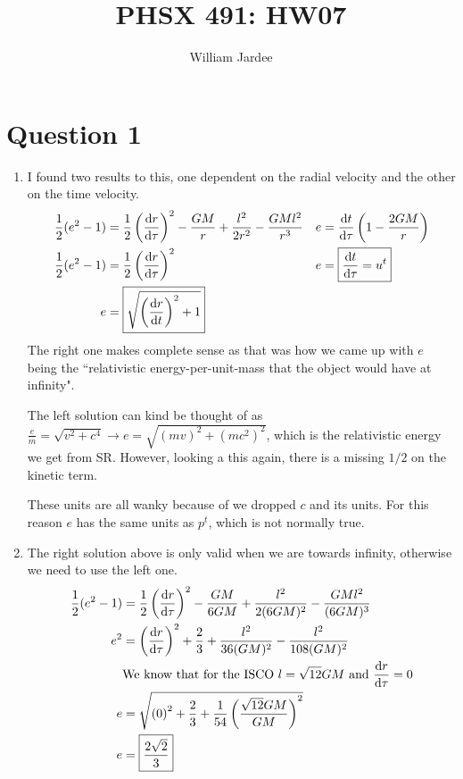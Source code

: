 \documentclass[11pt]{article}
\begin{document}
\title{PHSX 491: HW07}
\author{William Jardee}
\maketitle

\section*{Question 1}
\begin{enumerate}[label=\alph*)]
\item I found two results to this, one dependent on the radial velocity and the other on the time velocity.
\begin{align*}
\frac{1}{2}(e^2 - 1) & = \frac{1}{2}\left(\dv{r}{\tau}\right)^2 - \frac{GM}{r}+ \frac{l^2}{2r^2} - \frac{GMl^2}{r^3} & e & = \dv{t}{\tau} \left(1 - \frac{2GM}{r}\right)\\
\frac{1}{2}(e^2 - 1) & = \frac{1}{2}\left(\dv{r}{\tau}\right)^2 & e & = \boxed{ \dv{t}{\tau} = u^t}\\
e & = \boxed{ \sqrt{\left(\dv{r}{t}\right)^2 + 1}} 
\end{align*}
The right one makes complete sense as that was how we came up with $e$ being the ``relativistic energy-per-unit-mass that the object would have at infinity".

The left solution can kind be thought of as $\displaystyle{\frac{e}{m} = \sqrt{v^2 + c^4} \rightarrow e = \sqrt{(mv)^2 + (mc^2)^2}}$, which is the relativistic energy we get from SR. However, looking a this again, there is a missing $1/2$ on the kinetic term. 

These units are all wanky because of we dropped $c$ and its units. For this reason $e$ has the same units as $p^t$, which is not normally true. 

\item The right solution above is only valid when we are towards infinity, otherwise we need to use the left one.
\begin{align*}
\frac{1}{2}(e^2-1) & = \frac{1}{2}\left(\dv{r}{\tau}\right)^2 - \frac{GM}{6GM} + \frac{l^2}{2(6GM)^2} - \frac{GMl^2}{(6GM)^3} \\
e^2 & = \left(\dv{r}{\tau}\right)^2 + \frac{2}{3} + \frac{l^2}{36(GM)^2} - \frac{l^2}{108(GM)^2} \\
& \text{We know that for the ISCO } l = \sqrt{12}GM \text{ and } \dv{r}{\tau} = 0\\
e & = \sqrt{\left(0\right)^2 + \frac{2}{3} + \frac{1}{54}\left(\frac{\sqrt{12}GM}{GM}\right)^2}\\
e & = \boxed{\frac{2\sqrt{2}}{3}}
\end{align*}


\end{enumerate}
\end{document}
